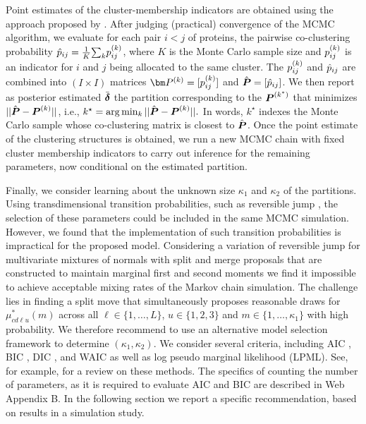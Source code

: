 Point estimates of the cluster-membership indicators are obtained using the
approach proposed by \cite{dahl2006}. After
judging (practical) convergence of the MCMC algorithm, we evaluate for each pair $i<j$ of
proteins, the pairwise co-clustering probability $\hat{p}_{ij} = \frac 1K
{\sum_k} p_{ij}^{(k)}$, where $K$ is the Monte Carlo sample size and $p_{ij}^{(k)}$ is
an indicator for $i$ and $j$ being allocated to the same cluster. The
$p_{ij}^{(k)}$ and $\hat{p}_{ij}$ are combined into $(I \times I)$ matrices
$\bfPk = [\pijk]$ and $\hat{\mbox{\boldmath $P$}} = [\hat{p}_{ij}]$. We then report as
posterior estimated $\bar{\mbox{\boldmath $\delta$}}$ the partition corresponding to the $\mbox{\boldmath $P$}^{(k^*)}$
that minimizes $ ||\hat{\mbox{\boldmath $P$}} - \mbox{\boldmath $P$}^{(k)} ||$, i.e.,
$
  k^\star = \arg\min_k || \hat{\mbox{\boldmath $P$}} - \mbox{\boldmath $P$}^{(k)} ||.
$
In words, $k^\star$ indexes the Monte Carlo sample whose co-clustering
matrix is closest to $\hat{\mbox{\boldmath $P$}}$. Once the point estimate of the
clustering structures is obtained, we run a new MCMC chain with fixed
cluster membership indicators to carry out inference for the remaining
parameters, now conditional on the estimated partition.

Finally, we consider learning about the unknown size $\kappa_1$ and
$\kappa_2$ of the partitions.
Using transdimensional transition probabilities, such as reversible jump
\citep{green1995},
the selection of these parameters could be included
in the same MCMC simulation.
However, we found that the implementation of such transition
probabilities is impractical for the proposed model. Considering a
variation of reversible jump for multivariate mixtures of normals with split and
merge proposals that are constructed to maintain marginal first and
second moments
\citep{zhang2004,Dellaportas2006}
we find it impossible to achieve acceptable mixing rates of the Markov
chain simulation. The challenge lies in finding a split move that simultaneously proposes reasonable draws for $\mu^*_{cd\ell u}(m)$ across all $\ell\in \{1, \ldots, L\}$, $u\in \{1, 2, 3\}$ and $m\in \{1, \ldots, \kappa_1\}$ with high probability. We therefore recommend to use an alternative model
selection framework to determine $(\kappa_1,\kappa_2)$.
We consider several criteria, including AIC \citep{akaike1973}, BIC
\citep{schwarz1978}, DIC \citep{spiegelhalter2002}, and WAIC
\citep{watanabe2010} as well as log pseudo marginal likelihood (LPML).
See, for example, \cite{gelman2014} for a review on these methods. The
specifics of counting the number of parameters, as it is required to
evaluate AIC and BIC are described in Web Appendix B.
In the following section we report a specific recommendation, based on
results in a simulation study. 

